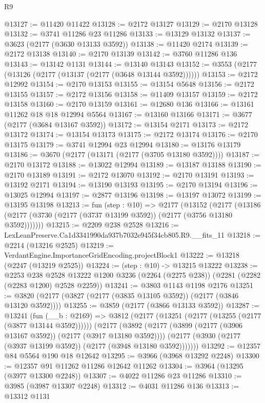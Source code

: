 \begin{lexlean}{R9}
\begin{coremodule}
@13127 := @11420 @11422
@13128 := @2172 @13127
@13129 := @2170 @13128
@13132 := @3741 @11286 @23 @11286
@13133 := @13129 @13132
@13137 := @3623 (@2177 (@3630 @13133 @3592))
@13138 := @11420 @2174
@13139 := @2172 @13138
@13140 := @2170 @13139
@13142 := @3760 @11286 @136
@13143 := @13142 @1131
@13144 := @13140 @13143
@13152 := @3553 (@2177 (@13126 (@2177 (@13137 (@2177 (@3648 @13144 @3592))))))
@13153 := @2172 @12992
@13154 := @2170 @13153
@13155 := @13154 @5648
@13156 := @2172 @13155
@13157 := @2172 @13156
@13158 := @11409 @13157
@13159 := @2172 @13158
@13160 := @2170 @13159
@13161 := @12680 @136
@13166 := @13161 @11262 @18 @18 @12994 @5564
@13167 := @13160 @13166
@13171 := @3677 (@2177 (@3684 @13167 @3592))
@13172 := @13154 @2171
@13173 := @2172 @13172
@13174 := @13154 @13173
@13175 := @2172 @13174
@13176 := @2170 @13175
@13179 := @3741 @12994 @23 @12994
@13180 := @13176 @13179
@13186 := @3670 (@2177 (@13171 (@2177 (@3705 @13180 @3592))))
@13187 := @2170 @13172
@13188 := @13022 @12994
@13189 := @13187 @13188
@13190 := @2170 @13189
@13191 := @2172 @13070
@13192 := @2170 @13191
@13193 := @13192 @2171
@13194 := @13190 @13193
@13195 := @2170 @13194
@13196 := @13025 @12994
@13197 := @2877 @13196
@13198 := @13197 @13072
@13199 := @13195 @13198
@13213 := fun (step : @10) =>
  @2177
    (@13152
      (@2177 (@13186 (@2177 (@3730 (@2177 (@3737 @13199 @3592)) (@2177 (@3756 @13180 @3592)))))))
@13215 := @2209 @238 @2528
@13216 := LexLeanPreserve.Ca1d3341990da937b7032e945f34cb805.R9.__fits_11
@13218 := @2214 (@13216 @2525)
@13219 := VerdantEngine.ImportanceGridEncoding.projectBlock1
@13222 := @13218 (@2247 (@13219 @2525))
@13224 := (step : @10) -> @13215 @13222
@13238 := @2253
    @238
    @2528
    @13222
    @1200
    @3236
    (@2264 (@2275 @238))
    (@2281 (@2282 (@2283 @1200) @2528 @2259))
@13241 := @3803 @1143 @1198 @2176
@13251 := @3820 (@2177 (@3827 (@2177 (@3835 @13105 @3592)) (@2177 (@3846 @13120 @3592))))
@13255 := @3859 (@2177 (@3866 @13133 @3592))
@13287 := @13241
    (fun (__b : @2169) =>
    @3812
      (@2177 (@13251 (@2177 (@13255 (@2177 (@3877 @13144 @3592))))))
      (@2177
        (@3892
          (@2177 (@3899 (@2177 (@3906 @13167 @3592)) (@2177 (@3917 @13180 @3592))))
          (@2177 (@3930 (@2177 (@3937 @13199 @3592)) (@2177 (@3948 @13180 @3592)))))))
@13292 := @12357 @84 @5564 @190 @18 @12642
@13295 := @3966 (@3968 @13292 @2248)
@13300 := @12357 @91 @11262 @11286 @12642 @11262
@13304 := @3964 (@13295 (@3977 @13300 @2248))
@13307 := @4022 @11286 @23 @11286
@13310 := @3985 (@3987 @13307 @2248)
@13312 := @4031 @11286 @136
@13313 := @13312 @1131

\end{coremodule}
\end{lexlean}
